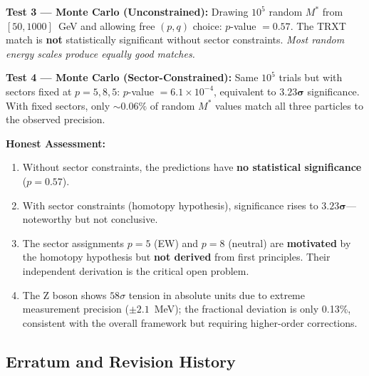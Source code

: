 \textbf{Test 3 --- Monte Carlo (Unconstrained):}
Drawing $10^5$ random $M^*$ from $[50, 1000]$~GeV and allowing free $(p,q)$ choice: $p$-value $= 0.57$.  The TRXT match is \textbf{not} statistically significant without sector constraints.  \emph{Most random energy scales produce equally good matches.}

\textbf{Test 4 --- Monte Carlo (Sector-Constrained):}
Same $10^5$ trials but with sectors fixed at $p = 5, 8, 5$: $p$-value $= 6.1 \times 10^{-4}$, equivalent to $\mathbf{3.23\sigma}$ significance.  With fixed sectors, only $\sim 0.06\%$ of random $M^*$ values match all three particles to the observed precision.

\begin{mdframed}[backgroundcolor=yellow!10]
\textbf{Honest Assessment:}
\begin{enumerate}
    \item Without sector constraints, the predictions have \textbf{no statistical significance} ($p = 0.57$).
    \item With sector constraints (homotopy hypothesis), significance rises to $\mathbf{3.23\sigma}$---noteworthy but not conclusive.
    \item The sector assignments $p = 5$ (EW) and $p = 8$ (neutral) are \textbf{motivated} by the homotopy hypothesis but \textbf{not derived} from first principles.  Their independent derivation is the critical open problem.
    \item The Z boson shows $58\sigma$ tension in absolute units due to extreme measurement precision ($\pm 2.1$~MeV); the fractional deviation is only 0.13\%, consistent with the overall framework but requiring higher-order corrections.
\end{enumerate}
\end{mdframed}

\subsection{Erratum and Revision History}

